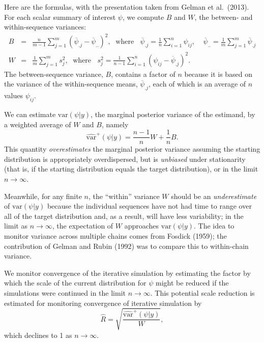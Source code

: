 \documentclass[11pt]{article}
\begin{document}
Here are the formulas, with the presentation taken from Gelman et al.\ (2013).  For each scalar summary of interest $\psi$, we compute $B$ and $W$, the between- and within-sequence variances:
\begin{eqnarray*}
B \!\!&=&\!\!
 \frac{n}{m-1}\sum_{j=1}^{m}(\overline{\psi}_{.j}-\overline{\psi}_{..})^2,
\;\mbox{ where }\;\;\overline{\psi}_{.j}=\frac{1}{n}\sum_{i=1}^n \psi_{ij},\;\;
\;\;\overline{\psi}_{..} = \frac{1}{m}\sum_{j=1}^m\overline{\psi}_{.j}\\
W \!\!&=&\!\!
 \frac{1}{m}\sum_{j=1}^{m}s_j^2, \;\mbox{ where }\;\; s_j^2=\frac{1}{n-1}
\sum_{i=1}^n (\psi_{ij}-\overline{\psi}_{.j})^2.
\end{eqnarray*}
The between-sequence variance, $B$, contains a factor of $n$ because it is based on the variance of the within-sequence means, $\overline{\psi}_{.j}$, each of which is an average of $n$ values $\psi_{ij}$.

We can estimate $\mbox{var}(\psi|y)$, the marginal posterior variance of the estimand, by a weighted average of $W$ and $B$, namely
\begin{equation}\label{hatsig}
\widehat{\mbox{var}}^+(\psi|y)=\frac{n-1}{n}W + \frac{1}{n}B.
\end{equation}
This quantity {\em overestimates}
the marginal posterior variance assuming the starting distribution
is appropriately overdispersed, but is {\em unbiased} under
stationarity (that is, if the starting distribution equals the target
distribution), or
in the limit $n\rightarrow\infty$.

Meanwhile, for any finite $n$, the ``within'' variance
$W$ should be an {\em underestimate}
of $\mbox{var}(\psi|y)$ because the individual sequences have not had
time to range over all of the target distribution and, as a result,
will have less variability; in the limit as $n\rightarrow\infty$, the
expectation of $W$ approaches $\mbox{var}(\psi|y)$. The idea to monitor variance across multiple chains comes from Fosdick (1959); the contribution of Gelman and Rubin (1992) was to compare this to within-chain variance.


We monitor convergence of the iterative simulation by estimating
the factor by which the scale of the current distribution for $\psi$
might be reduced if the simulations were continued in the limit
$n\rightarrow\infty$.  This potential scale reduction is estimated for monitoring convergence of iterative simulation by
\begin{equation}\label{rhat.defined}
\widehat{R}=
\sqrt{\frac{\widehat{\mbox{var}}^+(\psi|y)}{W}},
\end{equation}
which declines to 1 as $n\rightarrow\infty$.
\end{document}
